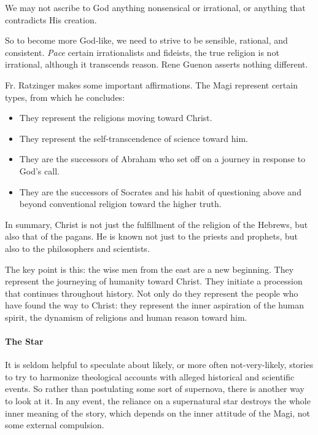 \begin{quotex}
We may not ascribe to God anything nonsensical or irrational, or anything that contradicts His creation. 

\end{quotex}
So to become more God-like, we need to strive to be sensible, rational, and consistent. \emph{Pace} certain irrationalists and fideists, the true religion is not irrational, although it transcends reason. Rene Guenon asserts nothing different.

Fr. Ratzinger makes some important affirmations. The Magi represent certain types, from which he concludes:

\begin{itemize}
\item They represent the religions moving toward Christ. 
\item They represent the self-transcendence of science toward him. 
\item They are the successors of Abraham who set off on a journey in response to God's call. 
\item They are the successors of Socrates and his habit of questioning above and beyond conventional religion toward the higher truth. 
\end{itemize}
In summary, Christ is not just the fulfillment of the religion of the Hebrews, but also that of the pagans. He is known not just to the priests and prophets, but also to the philosophers and scientists.

\begin{quotex}
The key point is this: the wise men from the east are a new beginning. They represent the journeying of humanity toward Christ. They initiate a procession that continues throughout history. Not only do they represent the people who have found the way to Christ: they represent the inner aspiration of the human spirit, the dynamism of religions and human reason toward him. 

\end{quotex}
\paragraph{The Star}
It is seldom helpful to speculate about likely, or more often not-very-likely, stories to try to harmonize theological accounts with alleged historical and scientific events. So rather than postulating some sort of supernova, there is another way to look at it. In any event, the reliance on a supernatural star destroys the whole inner meaning of the story, which depends on the inner attitude of the Magi, not some external compulsion.

